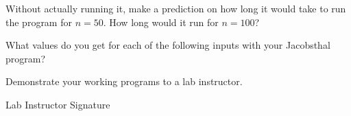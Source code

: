 \documentclass[10pt]{exam}
\begin{document}
\begin{questions}
\question Without actually running it, make a prediction on how long 
  it would take to run the program for $n = 50$.  How long would it 
  run for $n = 100$?

\question What values do you get for each of the following inputs with 
  your Jacobsthal program?

\question Demonstrate your working programs to a lab instructor.  

\end{questions}
  
Lab Instructor Signature\underline{\hspace{7.5cm}}
\end{document}
